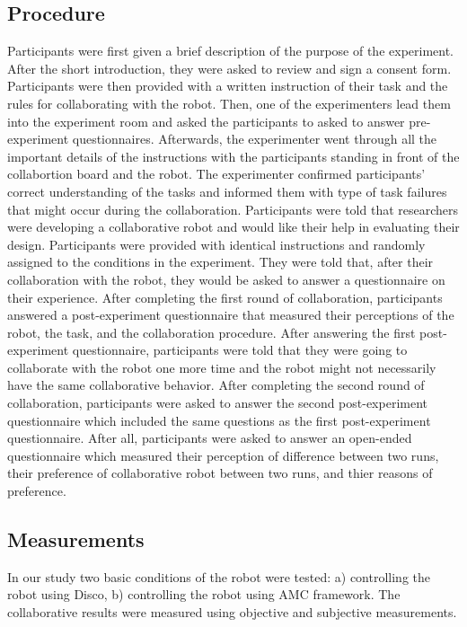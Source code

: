 \documentclass{sig-alternate-05-2015}
\begin{document}
\subsection{Procedure}
Participants were first given a brief description of the purpose of the
experiment. After the short introduction, they were asked to review and sign a
consent form. Participants were then provided with a written instruction of
their task and the rules for collaborating with the robot. Then, one of the
experimenters lead them into the experiment room and asked the participants
to asked to answer pre-experiment questionnaires. Afterwards, the experimenter
went through all the important details of the instructions with the participants
standing in front of the collabortion board and the robot. The experimenter
confirmed participants' correct understanding of the tasks and informed them
with type of task failures that might occur during the collaboration.
Participants were told that researchers were developing a collaborative robot
and would like their help in evaluating their design. Participants were provided
with identical instructions and randomly assigned to the conditions in the
experiment. They were told that, after their collaboration with the robot, they
would be asked to answer a questionnaire on their experience. After completing
the first round of collaboration, participants answered a post-experiment
questionnaire that measured their perceptions of the robot, the task, and
the collaboration procedure. After answering the first post-experiment
questionnaire, participants were told that they were going to collaborate with
the robot one more time and the robot might not necessarily have the same
collaborative behavior. After completing the second round of collaboration,
participants were asked to answer the second post-experiment questionnaire which
included the same questions as the first post-experiment questionnaire. After
all, participants were asked to answer an open-ended questionnaire which
measured their perception of difference between two runs, their preference of
collaborative robot between two runs, and thier reasons of preference.

\subsection{Measurements}

In our study two basic conditions of the robot were tested: a) controlling the
robot using Disco, b) controlling the robot using AMC framework. The
collaborative results were measured using objective and subjective measurements.
\end{document}
